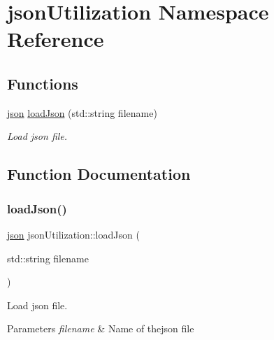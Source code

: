\hypertarget{namespacejson_utilization}{}\section{json\+Utilization Namespace Reference}
\label{namespacejson_utilization}
\subsection*{Functions}
\begin{DoxyCompactItemize}
\item 
\hyperlink{_json_utilization_8h_ab701e3ac61a85b337ec5c1abaad6742d}{json} \hyperlink{namespacejson_utilization_a574415854637f4005e9b44c80a610e35}{load\+Json} (std\+::string filename)
\begin{DoxyCompactList}\small\item\em Load json file. \end{DoxyCompactList}\end{DoxyCompactItemize}


\subsection{Function Documentation}
\mbox{\label{namespacejson_utilization_a574415854637f4005e9b44c80a610e35}} 
\subsubsection{\texorpdfstring{load\+Json()}{loadJson()}}
{\footnotesize\ttfamily \hyperlink{_json_utilization_8h_ab701e3ac61a85b337ec5c1abaad6742d}{json} json\+Utilization\+::load\+Json (\begin{DoxyParamCaption}\item[{std\+::string}]{filename }\end{DoxyParamCaption})}



Load json file. 


\begin{DoxyParams}{Parameters}
{\em filename} & Name of thejson file \\
\hline
\end{DoxyParams}
